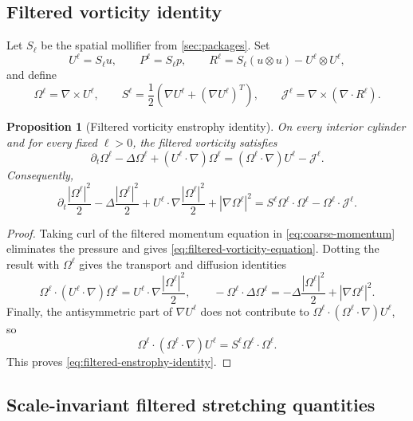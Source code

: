 \documentclass[11pt]{article}
\numberwithin{equation}{section}
\newtheorem{proposition}[theorem]{Proposition}
\theoremstyle{remark}
\begin{document}
\subsection{Filtered vorticity identity}

Let $S_\ell$ be the spatial mollifier from \cref{sec:packages}. Set
\[
U^\ell=S_\ell u,
\qquad
P^\ell=S_\ell p,
\qquad
R^\ell=S_\ell(u\otimes u)-U^\ell\otimes U^\ell,
\]
and define
\[
\Omega^\ell=\nabla\times U^\ell,
\qquad
S^\ell=\frac12(\nabla U^\ell+(\nabla U^\ell)^T),
\qquad
\mathcal J^\ell=\nabla\times(\nabla\cdot R^\ell).
\]

\begin{proposition}[Filtered vorticity enstrophy identity]\label{prop:filtered-vorticity-identity}
On every interior cylinder and for every fixed $\ell>0$, the filtered vorticity satisfies
\begin{equation}\label{eq:filtered-vorticity-equation}
\partial_t\Omega^\ell-\Delta\Omega^\ell+(U^\ell\cdot\nabla)\Omega^\ell
=(\Omega^\ell\cdot\nabla)U^\ell-\mathcal J^\ell.
\end{equation}
Consequently,
\begin{equation}\label{eq:filtered-enstrophy-identity}
\partial_t\frac{|\Omega^\ell|^2}{2}
-\Delta\frac{|\Omega^\ell|^2}{2}
+U^\ell\cdot\nabla\frac{|\Omega^\ell|^2}{2}
+|\nabla\Omega^\ell|^2
=
S^\ell\Omega^\ell\cdot\Omega^\ell
-\Omega^\ell\cdot\mathcal J^\ell.
\end{equation}
\end{proposition}

\begin{proof}
Taking curl of the filtered momentum equation in \eqref{eq:coarse-momentum} eliminates the pressure and gives \eqref{eq:filtered-vorticity-equation}. Dotting the result with $\Omega^\ell$ gives the transport and diffusion identities
\[
\Omega^\ell\cdot (U^\ell\cdot\nabla)\Omega^\ell
=U^\ell\cdot\nabla\frac{|\Omega^\ell|^2}{2},
\qquad
-\Omega^\ell\cdot\Delta\Omega^\ell
=-\Delta\frac{|\Omega^\ell|^2}{2}+|\nabla\Omega^\ell|^2.
\]
Finally, the antisymmetric part of $\nabla U^\ell$ does not contribute to $\Omega^\ell\cdot(\Omega^\ell\cdot\nabla)U^\ell$, so
\[
\Omega^\ell\cdot(\Omega^\ell\cdot\nabla)U^\ell
=S^\ell\Omega^\ell\cdot\Omega^\ell.
\]
This proves \eqref{eq:filtered-enstrophy-identity}.
\end{proof}

\subsection{Scale-invariant filtered stretching quantities}
\end{document}
